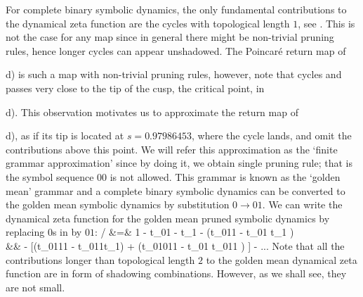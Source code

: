 For complete binary symbolic dynamics, the only fundamental contributions to
the dynamical zeta function are the cycles with topological length $1$, see
. This is not the case for any map since in general
there might be non-trivial pruning rules, hence longer cycles can appear unshadowed.
The Poincar\'e return map of \,{d) is such a map
with non-trivial pruning rules, however, note that cycles  and 
passes very close to the tip of the cusp, the critical point, in
\,{d). This observation motivates us to approximate
the return map of \,{d), as if its tip is located at
$s = 0.97986453$, where the cycle  lands, and omit the contributions
above this point. We will refer this approximation as the `finite grammar approximation'
since by doing it, we obtain single pruning rule; that is the symbol sequence
$00$ is not allowed. This grammar is known as the `golden mean' grammar and a
complete binary symbolic dynamics can be converted to the golden mean symbolic
dynamics by substitution $0 \rightarrow 01$. We can write the dynamical zeta
function for the golden mean pruned symbolic dynamics by replacing $0$s in
 by $01$:
 / \zeta &=& 1 - t_{01} - t_1 - (t_{011} - t_{01} t_1 ) \label{e-GoldenMeanCycleExpansion}\\
		  && - [(t_{0111} - t_{011}t_1) + (t_{01011} - t_{01} t_{011} ) ] - ... \nonumber
\eea
Note that all the contributions longer than topological length $2$ to the golden mean dynamical zeta function are in form of shadowing combinations. However, as we shall see, they are not small.

}}}
